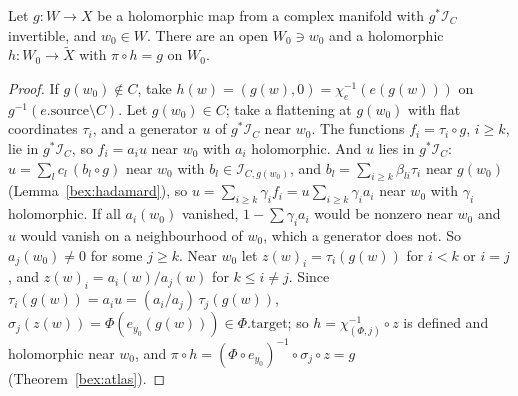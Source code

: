 \begin{lemma}
\label{bex:lift-local}
\leanok
Let \(g\colon W\to X\) be a holomorphic map from a complex manifold with \(g^*\mathcal I_C\) invertible, and \(w_0\in W\). There are an open
\(W_0\ni w_0\) and a holomorphic \(h\colon W_0\to\tilde X\) with \(\pi\circ h=g\) on \(W_0\).
\end{lemma}
\begin{proof}
\leanok
If \(g(w_0)\notin C\), take \(h(w)=(g(w),0)=\chi_e^{-1}(e(g(w)))\) on \(g^{-1}(e.\mathrm{source}\setminus C)\). Let \(g(w_0)\in C\); take a flattening
at \(g(w_0)\) with flat coordinates \(\tau_i\), and a generator \(u\) of \(g^*\mathcal I_C\) near \(w_0\). The functions \(f_i=\tau_i\circ g\), \(i\ge k\),
lie in \(g^*\mathcal I_C\), so \(f_i=a_iu\) near \(w_0\) with \(a_i\) holomorphic. And \(u\) lies in \(g^*\mathcal I_C\):
\(u=\sum_lc_l\,(b_l\circ g)\) near \(w_0\) with \(b_l\in\mathcal I_{C,g(w_0)}\), and \(b_l=\sum_{i\ge k}\beta_{li}\tau_i\) near \(g(w_0)\)
(Lemma~\ref{bex:hadamard}), so \(u=\sum_{i\ge k}\gamma_if_i=u\sum_{i\ge k}\gamma_ia_i\) near \(w_0\) with \(\gamma_i\) holomorphic. If all
\(a_i(w_0)\) vanished, \(1-\sum\gamma_ia_i\) would be nonzero near \(w_0\) and \(u\) would vanish on a neighbourhood of \(w_0\), which a generator
does not. So \(a_j(w_0)\ne0\) for some \(j\ge k\). Near \(w_0\) let \(z(w)_i=\tau_i(g(w))\) for \(i<k\) or \(i=j\), and
\(z(w)_i=a_i(w)/a_j(w)\) for \(k\le i\ne j\). Since \(\tau_i(g(w))=a_iu=(a_i/a_j)\,\tau_j(g(w))\), \(\sigma_j(z(w))=\Phi(e_{y_0}(g(w)))\in\Phi.\mathrm{target}\);
so \(h=\chi_{(\Phi,j)}^{-1}\circ z\) is defined and holomorphic near \(w_0\), and \(\pi\circ h=(\Phi\circ e_{y_0})^{-1}\circ\sigma_j\circ z=g\)
(Theorem~\ref{bex:atlas}).
\end{proof}


